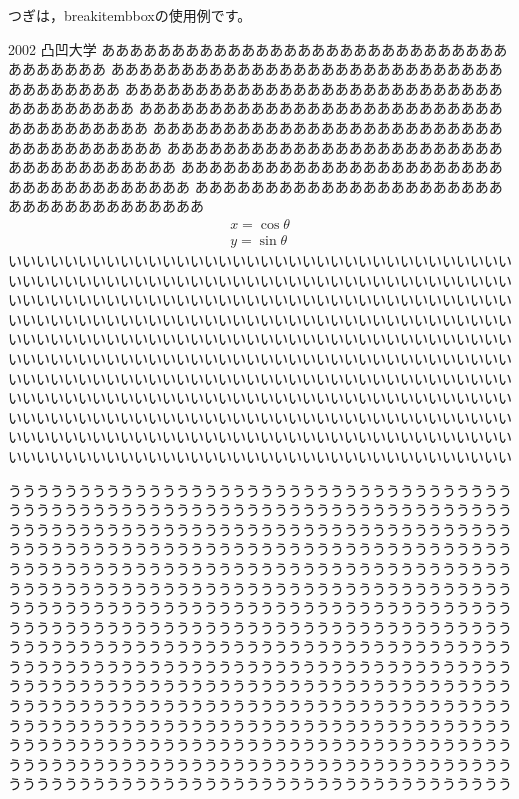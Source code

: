 \documentclass{jarticle}
\begin{document}
つぎは，\textsf{breakitembbox}の使用例です。

\begin{breakitembbox}{2002 凸凹大学}
ああああああああああああああああああああああああああああああああああああ
ああああああああああああああああああああああああああああああああああああ
ああああああああああああああああああああああああああああああああああああ
ああああああああああああああああああああああああああああああああああああ
ああああああああああああああああああああああああああああああああああああ
ああああああああああああああああああああああああああああああああああああ
ああああああああああああああああああああああああああああああああああああ
ああああああああああああああああああああああああああああああああああああ
\begin{align}
  x=\cos\theta\\
  y=\sin\theta
\end{align}
いいいいいいいいいいいいいいいいいいいいいいいいいいいいいいいいいいいい
いいいいいいいいいいいいいいいいいいいいいいいいいいいいいいいいいいいい
いいいいいいいいいいいいいいいいいいいいいいいいいいいいいいいいいいいい
いいいいいいいいいいいいいいいいいいいいいいいいいいいいいいいいいいいい
いいいいいいいいいいいいいいいいいいいいいいいいいいいいいいいいいいいい
いいいいいいいいいいいいいいいいいいいいいいいいいいいいいいいいいいいい
いいいいいいいいいいいいいいいいいいいいいいいいいいいいいいいいいいいい
いいいいいいいいいいいいいいいいいいいいいいいいいいいいいいいいいいいい
いいいいいいいいいいいいいいいいいいいいいいいいいいいいいいいいいいいい
いいいいいいいいいいいいいいいいいいいいいいいいいいいいいいいいいいいい
いいいいいいいいいいいいいいいいいいいいいいいいいいいいいいいいいいいい

うううううううううううううううううううううううううううううううううううう
うううううううううううううううううううううううううううううううううううう
うううううううううううううううううううううううううううううううううううう
うううううううううううううううううううううううううううううううううううう
うううううううううううううううううううううううううううううううううううう
うううううううううううううううううううううううううううううううううううう
うううううううううううううううううううううううううううううううううううう
うううううううううううううううううううううううううううううううううううう
うううううううううううううううううううううううううううううううううううう
うううううううううううううううううううううううううううううううううううう
うううううううううううううううううううううううううううううううううううう
うううううううううううううううううううううううううううううううううううう
うううううううううううううううううううううううううううううううううううう
うううううううううううううううううううううううううううううううううううう
うううううううううううううううううううううううううううううううううううう
うううううううううううううううううううううううううううううううううううう
\end{breakitembbox}
\end{document}
